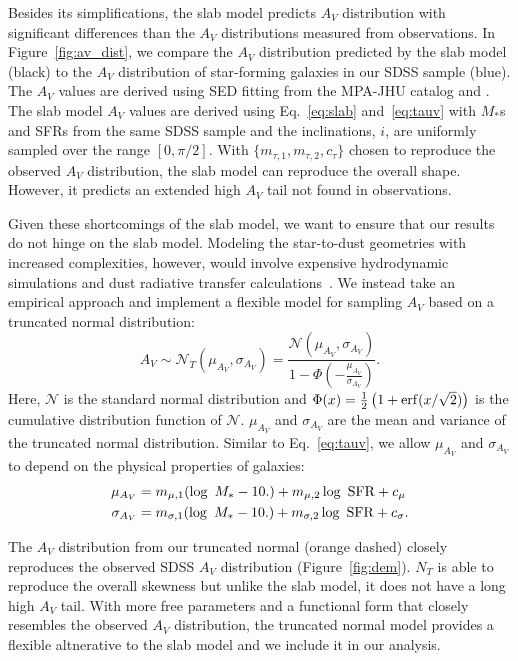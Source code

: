 Besides its simplifications, the slab model predicts $A_V$ distribution with
significant differences than the $A_V$ distributions measured from
observations. In Figure~\ref{fig:av_dist}, we compare the $A_V$
distribution predicted by the slab model (black) to the $A_V$ 
distribution of star-forming galaxies in our SDSS sample (blue). The $A_V$
values are derived using SED fitting from the \cite{brinchmann2004} MPA-JHU
catalog and . The slab model $A_V$ values are derived using Eq.~\ref{eq:slab}
and~\ref{eq:tauv} with $M_*$s and SFRs from the same SDSS sample and the
inclinations, $i$, are uniformly sampled over the range $[0, \pi/2]$. 
With $\{m_{\tau,1}, m_{\tau,2}, c_\tau\}$ chosen to reproduce the observed
$A_V$ distribution, the slab model can reproduce the overall shape. However, it
predicts an extended high $A_V$ tail not found in observations.

Given these shortcomings of the slab model, we want to ensure that our results
do not hinge on the slab model. Modeling the star-to-dust geometries with
increased complexities, however, would involve expensive hydrodynamic 
simulations and dust radiative transfer
calculations~\citep[\emph{e.g.}][]{narayanan2018}. We instead
take an empirical approach and implement a flexible model for sampling $A_V$
based on a truncated normal distribution: 
\begin{equation} \label{eq:tnorm}
    A_V \sim \mathcal{N}_T(\mu_{A_V}, \sigma_{A_V}) =
    \frac{\mathcal{N}(\mu_{A_V}, \sigma_{A_V})}{1 -
    \Phi\left(-\frac{\mu_{A_V}}{\sigma_{A_V}}\right)}.
\end{equation}
Here, $\mathcal{N}$ is the standard normal distribution and 
$\Phi(x) = \frac{1}{2}\left(1+{\rm erf}(x/\sqrt{2})\right)$ is the cumulative
distribution function of $\mathcal{N}$. $\mu_{A_V}$ and $\sigma_{A_V}$
are the mean and variance of the truncated normal distribution. Similar to
Eq.~\ref{eq:tauv}, we allow $\mu_{A_V}$ and $\sigma_{A_V}$ to depend on the
physical properties of galaxies: 
\begin{align}\label{eq:tnorm_param} 
    \mu_{A_V}       &= m_{\mu,1} (\log~M_* - 10.) + m_{\mu,2} \log~{\rm SFR} + c_\mu \\
    \sigma_{A_V}    &= m_{\sigma,1} (\log~M_* - 10.) + m_{\sigma,2} \log~{\rm SFR} + c_\sigma. 
\end{align}

The $A_V$ distribution from our truncated normal (orange dashed) closely
reproduces the observed SDSS $A_V$ distribution (Figure~\ref{fig:dem}). $N_T$
is able to reproduce the overall skewness but unlike the slab model, it does
not have a long high $A_V$ tail. With more free parameters and a functional
form that closely resembles the observed $A_V$ distribution, the truncated
normal model provides a flexible altnerative to the slab model and we include
it in our analysis.  

